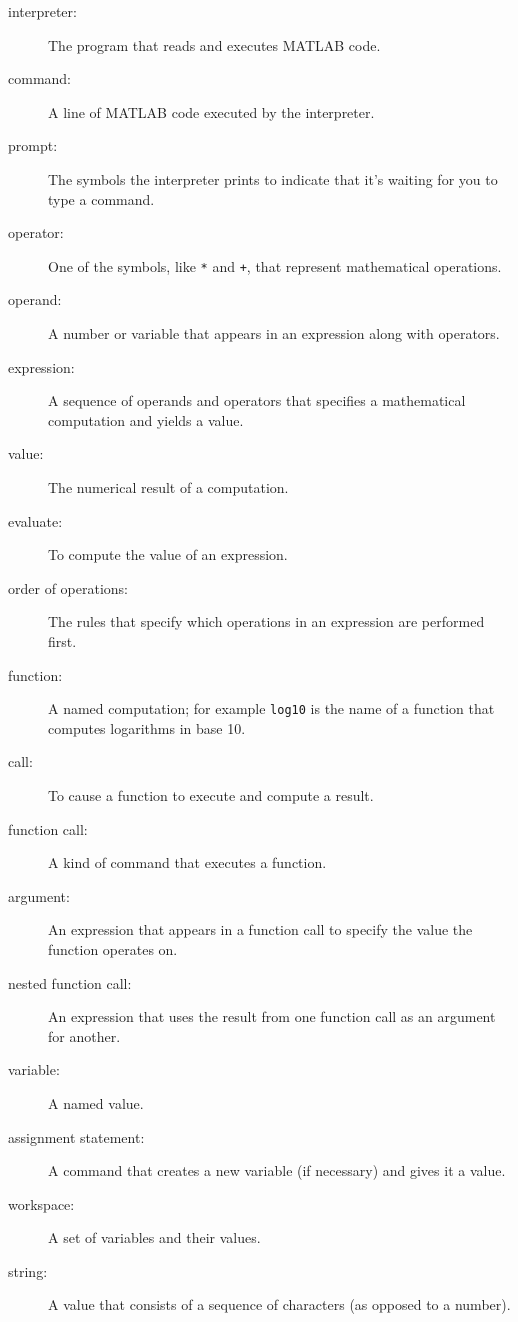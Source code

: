 \begin{description}

\item[interpreter:] The program that reads and executes MATLAB code.

\item[command:] A line of MATLAB code executed by the interpreter.

\item[prompt:] The symbols the interpreter prints to indicate that it's
waiting for you to type a command.

\item[operator:] One of the symbols, like \lstinline{*} and \lstinline{+}, that
represent mathematical operations.

\item[operand:] A number or variable that appears in an expression along
with operators.

\item[expression:] A sequence of operands and operators that specifies
a mathematical computation and yields a value.

\item[value:] The numerical result of a computation.

\item[evaluate:] To compute the value of an expression.

\item[order of operations:] The rules that specify which operations
in an expression are performed first.

\item[function:] A named computation; for example \lstinline{log10} is the
name of a function that computes logarithms in base 10.

\item[call:] To cause a function to execute and compute a result.

\item[function call:] A kind of command that executes a function.

\item[argument:] An expression that appears in a function call to
specify the value the function operates on.

\item[nested function call:] An expression that uses the result from
one function call as an argument for another.

\item[variable:] A named value.

\item[assignment statement:] A command that creates a new variable
(if necessary) and gives it a value.

\item[workspace:] A set of variables and their values.

\item[string:] A value that consists of a sequence of characters (as
opposed to a number).


\end{description}


